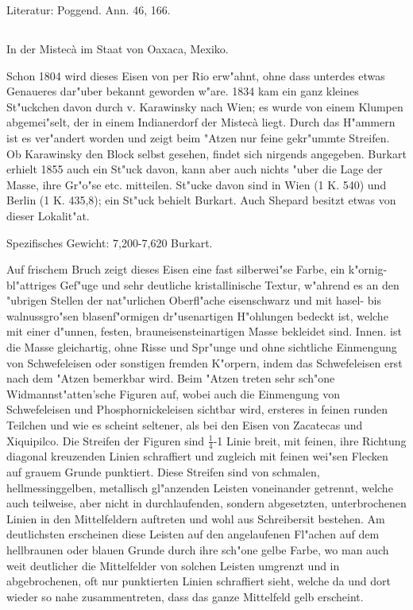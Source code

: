 \documentclass[a4paper, 11pt, oneside]{article}
\begin{document}
\normalsize
Literatur: Poggend. Ann. 46, 166.

\subsection{}
\LARGE
\paragraph{}
In der Mistecà im Staat von Oaxaca, Mexiko.

Schon 1804 wird dieses Eisen von per Rio erw"ahnt, ohne dass unterdes etwas Genaueres dar"uber bekannt geworden w"are. 1834 kam ein ganz kleines St"uckchen davon durch v. Karawinsky nach Wien; es wurde von einem Klumpen abgemei"selt, der in einem Indianerdorf der Mistecà liegt. Durch das H"ammern ist es ver"andert worden und zeigt beim "Atzen nur feine gekr"ummte Streifen. Ob Karawinsky den Block selbst gesehen, findet sich nirgends angegeben. Burkart erhielt 1855 auch ein St"uck davon, kann aber auch nichts "uber die Lage der Masse, ihre Gr"o"se etc. mitteilen. St"ucke davon sind in Wien (1 K. 540) und Berlin (1 K. 435,8); ein St"uck behielt Burkart. Auch Shepard besitzt etwas von dieser Lokalit"at.

Spezifisches Gewicht: 7,200-7,620 Burkart.

Auf frischem Bruch zeigt dieses Eisen eine fast silberwei"se Farbe, ein k"ornig-bl"attriges Gef"uge und sehr deutliche kristallinische Textur, w"ahrend es an den "ubrigen Stellen der nat"urlichen Oberfl"ache eisenschwarz und mit hasel- bis walnussgro"sen blasenf"ormigen dr"usenartigen H"ohlungen bedeckt ist, welche mit einer d"unnen, festen, brauneisensteinartigen Masse bekleidet sind. Innen. ist die Masse gleichartig, ohne Risse und Spr"unge und ohne sichtliche Einmengung von Schwefeleisen oder sonstigen fremden K"orpern, indem das Schwefeleisen erst nach dem "Atzen bemerkbar wird. Beim "Atzen treten sehr sch"one Widmannst"atten'sche Figuren auf, wobei auch die Einmengung von Schwefeleisen und Phosphornickeleisen sichtbar wird, ersteres in feinen runden Teilchen und wie es scheint seltener, als bei den Eisen von Zacatecas und Xiquipilco. Die Streifen der Figuren sind $\mathfrak{\frac{1}{4}}$-1 Linie breit, mit feinen, ihre Richtung diagonal kreuzenden Linien schraffiert und zugleich mit feinen wei"sen Flecken auf grauem Grunde punktiert. Diese Streifen sind von schmalen, hellmessinggelben, metallisch gl"anzenden Leisten voneinander getrennt, welche auch teilweise, aber nicht in durchlaufenden, sondern abgesetzten, unterbrochenen Linien in den Mittelfeldern auftreten und wohl aus Schreibersit bestehen. Am deutlichsten erscheinen diese Leisten auf den angelaufenen Fl"achen auf dem hellbraunen oder blauen Grunde durch ihre sch"one gelbe Farbe, wo man auch weit deutlicher die Mittelfelder von solchen Leisten umgrenzt und in abgebrochenen, oft nur punktierten Linien schraffiert sieht, welche da und dort wieder so nahe zusammentreten, dass das ganze Mittelfeld gelb erscheint.
\end{document}
